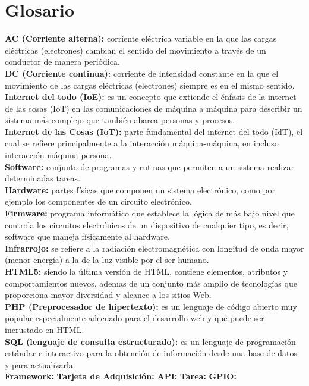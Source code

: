 \chapter*{Glosario}

\textbf{AC (Corriente alterna):} corriente eléctrica variable en la que las cargas eléctricas (electrones) cambian el sentido del movimiento a través de un conductor de manera periódica.\\

\textbf{DC (Corriente continua):} corriente de intensidad constante en la que el movimiento de las cargas eléctricas (electrones) siempre es en el mismo sentido.\\

\textbf{Internet del todo (IoE):} es un concepto que extiende el énfasis de la internet de las cosas (IoT) en las comunicaciones de máquina a máquina para describir un sistema más complejo que también abarca personas y procesos.\cite{IOE} \\

\textbf{Internet de las Cosas (IoT):} parte fundamental del internet del todo (IdT), el cual se refiere principalmente a la interacción máquina-máquina, en incluso interacción máquina-persona.\\

\textbf{Software:} conjunto de programas y rutinas que permiten a un sistema realizar determinadas tareas.\\

\textbf{Hardware:} partes físicas que componen un sistema electrónico, como por ejemplo los componentes de un circuito electrónico.\\

\textbf{Firmware:} programa informático que establece la lógica de más bajo nivel que controla los circuitos electrónicos de un dispositivo de cualquier tipo, es decir, software que maneja físicamente al hardware.\\

\textbf{Infrarrojo:} se refiere a la radiación electromagnética con longitud de onda mayor (menor energía) a la de la luz visible por el ser humano.\\

\textbf{HTML5:} siendo la última versión de HTML, contiene elementos, atributos y comportamientos nuevos, ademas de un conjunto más amplio de tecnologías que proporciona mayor diversidad y alcance a los sitios Web. \\

\textbf{PHP (Preprocesador de hipertexto):} es un lenguaje de código abierto muy popular especialmente adecuado para el desarrollo web y que puede ser incrustado en HTML.\\

\textbf{SQL (lenguaje de consulta estructurado):} es un lenguaje de programación estándar e interactivo para la obtención de información desde una base de datos y para actualizarla.\\

\textbf{Framework:}
\textbf{Tarjeta de Adquisición:}
\textbf{API:}
\textbf{Tarea:}
\textbf{GPIO:}